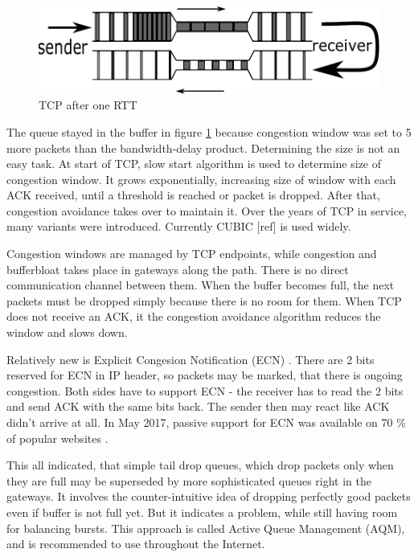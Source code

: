 \begin{figure}
	\centering
	\includegraphics[width=137mm]{drawings/tcp_bottleneck_2}
	\caption{TCP after one RTT}
	
	\label{fig03:bottle_2}
\end{figure}

The queue stayed in the buffer in figure  \ref{fig03:bottle_2} because congestion window was set to 5 more packets than the bandwidth-delay product. Determining the size is not an easy task. At start of TCP, slow start algorithm \cite{Jacobson:1988:CAC:52324.52356} is used to determine size of congestion window. It grows exponentially, increasing size of window with each ACK received, until a threshold is reached or packet is dropped.  After that, congestion avoidance takes over to maintain it. Over the years of TCP in service, many variants were introduced. Currently CUBIC [ref] is used widely. 

Congestion windows are managed by TCP endpoints, while congestion and bufferbloat takes place in gateways along the path. There is no direct communication channel between them. When the buffer becomes full, the next packets must be dropped simply because there is no room for them. When TCP does not receive an ACK, it the congestion avoidance algorithm reduces the window and slows down.

Relatively new is Explicit Congesion Notification (ECN) \cite{rfc3168:ECN}. There are 2 bits reserved for ECN in IP header, so packets may be marked, that there is ongoing congestion. Both sides have to support ECN  - the receiver has to read the 2 bits and send ACK with the same bits back. The sender then may react like ACK didn't arrive at all. In May 2017, passive support for ECN was available on 70 \% of popular websites \cite{ECN:proceedings}.

This all indicated, that simple tail drop queues, which drop packets only when they are full may be superseded by more sophisticated queues right in the gateways. It involves the counter-intuitive idea of dropping perfectly good packets even if buffer is not full yet. But it indicates a problem, while still having room for balancing bursts. This approach is called Active Queue Management (AQM), and is recommended to use throughout the Internet.


